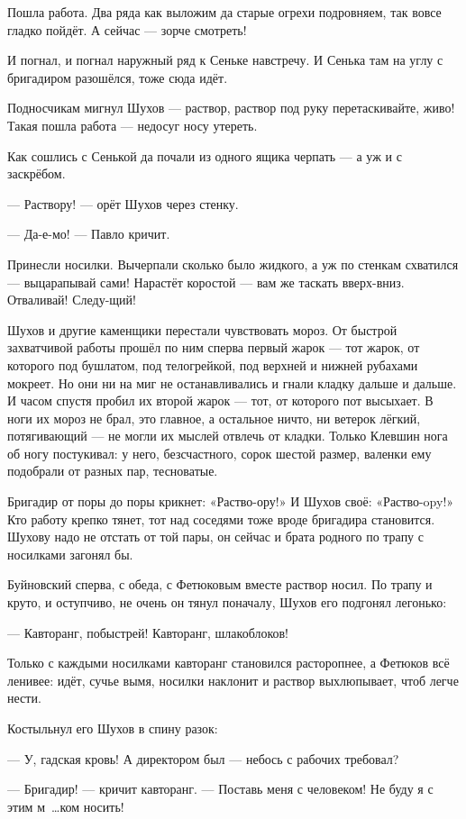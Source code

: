 Пошла работа. Два ряда как выложим да старые огрехи подровняем, так вовсе гладко пойдёт. А 
сейчас --- зорче смотреть!

И погнал, и погнал наружный ряд к Сеньке навстречу. И Сенька там на углу с бригадиром 
разошёлся, тоже сюда идёт.

Подносчикам мигнул Шухов --- раствор, раствор под руку перетаскивайте, живо! Такая пошла 
работа --- недосуг носу утереть.

Как сошлись с Сенькой да почали из одного ящика черпать --- а уж и с заскрёбом.

--- Раствору! --- орёт Шухов через стенку.

--- Да-е-мо! --- Павло кричит.

Принесли носилки. Вычерпали сколько было жидкого, а уж по стенкам схватился --- выцарапывай 
сами! Нарастёт коростой --- вам же таскать вверх-вниз. Отваливай! Следу-щий!

Шухов и другие каменщики перестали чувствовать мороз. От быстрой захватчивой работы прошёл 
по ним сперва первый жарок --- тот жарок, от которого под бушлатом, под телогрейкой, под 
верхней и нижней рубахами мокреет. Но они ни на миг не останавливались и гнали кладку дальше 
и дальше. И часом спустя пробил их второй жарок --- тот, от которого пот высыхает. В ноги их 
мороз не брал, это главное, а остальное ничто, ни ветерок лёгкий, потягивающий --- не могли их 
мыслей отвлечь от кладки. Только Клевшин нога об ногу постукивал: у него, безсчастного, сорок 
шестой размер, валенки ему подобрали от разных пар, тесноватые.

Бригадир от поры до поры крикнет: «Раство-ору!» И Шухов своё: «Раство-opy!» Кто работу крепко 
тянет, тот над соседями тоже вроде бригадира становится. Шухову надо не отстать от той пары, 
он сейчас и брата родного по трапу с носилками загонял бы.

Буйновский сперва, с обеда, с Фетюковым вместе раствор носил. По трапу и круто, и оступчиво, 
не очень он тянул поначалу, Шухов его подгонял легонько:

--- Кавторанг, побыстрей! Кавторанг, шлакоблоков!

Только с каждыми носилками кавторанг становился расторопнее, а Фетюков всё ленивее: идёт, 
сучье вымя, носилки наклонит и раствор выхлюпывает, чтоб легче нести.

Костыльнул его Шухов в спину разок:

--- У, гадская кровь! А директором был --- небось с рабочих требовал?

--- Бригадир! --- кричит кавторанг. --- Поставь меня с человеком! Не буду я с этим м~\dots{}ком носить!

